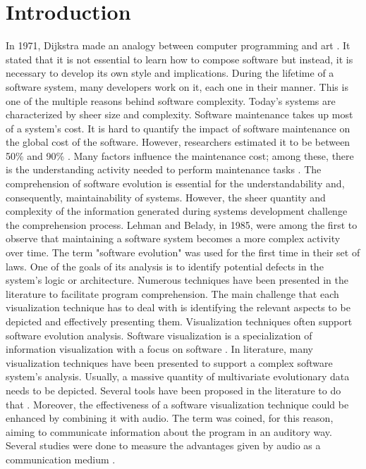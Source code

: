 \chapter{Introduction}

In 1971, Dijkstra made an analogy between computer programming and art \cite{Dijkstra1971a}.
It stated that it is not essential to learn how to compose software but instead, it is necessary to develop its own style and implications. 
During the lifetime of a software system, many developers work on it, each one in their manner. This is one of the multiple reasons behind software complexity. 
Today's systems are characterized by sheer size and complexity. Software maintenance takes up most of a system's cost. It is hard to quantify the impact of software maintenance on the global cost of the software. 
However, researchers estimated it to be between 50\% and 90\% \cite{Davis1995} \cite{Sommerville1995}\cite{Erlikh2000} \cite{seacord2003}. Many factors influence the maintenance cost; among these, there is the understanding activity needed to perform maintenance tasks \cite{Corbi1989}. The comprehension of software evolution is essential for the understandability and, consequently, maintainability of systems. However, the sheer quantity and complexity of the information generated during systems development challenge the comprehension process. Lehman and Belady, in 1985, were among the first to observe that maintaining a software system becomes a more complex activity over time. \cite{Lehman1985} The term "software evolution" was used for the first time in their set of laws.  One of the goals of its analysis is to identify potential defects in the system's logic or architecture. Numerous techniques have been presented in the literature to facilitate program comprehension. The main challenge that each visualization technique has to deal with is identifying the relevant aspects to be depicted and effectively presenting them. Visualization techniques often support software evolution analysis. Software visualization is a specialization of information visualization with a focus on software \cite{Lanza2003}. In literature, many visualization techniques have been presented to support a complex software system's analysis. Usually, a massive quantity of multivariate evolutionary data needs to be depicted. Several tools have been proposed in the literature to do that \cite{Merino2018a}. Moreover, the effectiveness of a software visualization technique could be enhanced by combining it with audio. The term  was coined, for this reason, aiming to communicate information about the program in an auditory way.
Several studies were done to measure the advantages given by audio as a communication medium \cite{Alty1995}.

